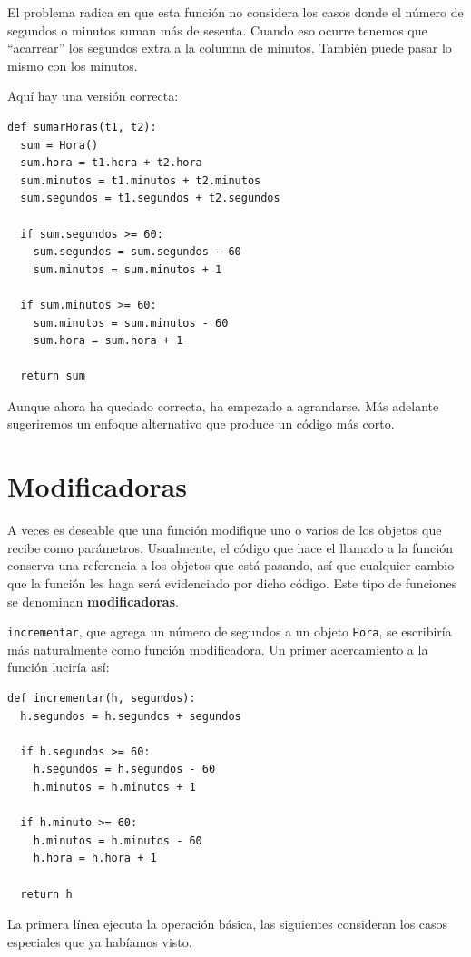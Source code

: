 El problema radica en que esta función no considera los casos donde
el número de segundos o minutos suman más de sesenta. Cuando eso 
ocurre tenemos que  ``acarrear'' los segundos extra a la columna
de  minutos. También puede pasar lo mismo con los minutos.

Aquí hay una versión correcta:

\begin{verbatim}
def sumarHoras(t1, t2):
  sum = Hora()
  sum.hora = t1.hora + t2.hora
  sum.minutos = t1.minutos + t2.minutos
  sum.segundos = t1.segundos + t2.segundos

  if sum.segundos >= 60:
    sum.segundos = sum.segundos - 60
    sum.minutos = sum.minutos + 1

  if sum.minutos >= 60:
    sum.minutos = sum.minutos - 60
    sum.hora = sum.hora + 1

  return sum
\end{verbatim}

Aunque ahora ha quedado correcta, ha empezado a agrandarse. Más
adelante sugeriremos un enfoque alternativo que produce un código
más corto.


\section{Modificadoras}
\label{increment}

A veces es deseable que  una función modifique uno o varios
de los objetos que recibe como parámetros. Usualmente, el 
código que hace el llamado a la función conserva una referencia a los
objetos que está pasando, así que cualquier cambio que la
función les haga será evidenciado por dicho código.
Este tipo de funciones se denominan {\bf modificadoras}.

\texttt{incrementar}, que agrega un número de segundos
a un objeto \texttt{Hora}, se escribiría más naturalmente
como función modificadora. Un primer acercamiento a la 
función luciría así:


\begin{verbatim}
def incrementar(h, segundos):
  h.segundos = h.segundos + segundos

  if h.segundos >= 60:
    h.segundos = h.segundos - 60
    h.minutos = h.minutos + 1

  if h.minuto >= 60:
    h.minutos = h.minutos - 60
    h.hora = h.hora + 1

  return h
\end{verbatim}
%
La primera línea ejecuta la operación básica, las siguientes
consideran los casos especiales que ya habíamos visto.

